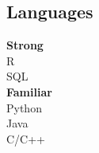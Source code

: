 \documentclass[letterpaper]{deedy-resume} %
\begin{document}
\begin{minipage}[t]{0.3\textwidth}
  \sectionspace %
  \vspace{3pt}
  \subsection{Languages}
  {\bf Strong\\}
  R\\
  SQL\\
  \vspace{4pt}
  {\bf{Familiar\\}}
  Python\\
  Java\\
  C/C++\\
  \vspace{4pt}


\end{minipage} %
\hfill
% 
% 
\end{document}
